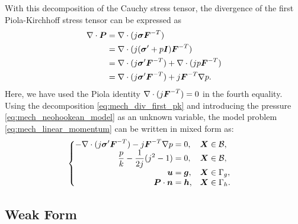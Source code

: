 With this decomposition of the Cauchy stress tensor, the divergence of the
first Piola-Kirchhoff stress tensor can be expressed as
%
\begin{gather}
\begin{aligned}
\nabla \cdot \boldsymbol{P} &= \nabla \cdot ( j \boldsymbol{\sigma} \boldsymbol{F}^{-T} ) \\
&= \nabla \cdot ( j (\boldsymbol{\sigma}' + p \boldsymbol{I}) \boldsymbol{F}^{-T} ) \\
&= \nabla \cdot ( j \boldsymbol{\sigma}' \boldsymbol{F}^{-T} ) +
\nabla \cdot ( j p \boldsymbol{F}^{-T} ) \\
&= \nabla \cdot ( j \boldsymbol{\sigma}' \boldsymbol{F}^{-T} ) + j \boldsymbol{F}^{-T} \nabla p.
\end{aligned}
\label{eq:mech_div_first_pk}
\end{gather}
%
Here, we have used the Piola identity $\nabla \cdot (j \boldsymbol{F}^{-T}) = 0$
in the fourth equality. Using the decomposition \eqref{eq:mech_div_first_pk}
and introducing the pressure \eqref{eq:mech_neohookean_model} as an unknown
variable, the model problem \eqref{eq:mech_linear_momentum} can be written
in mixed form as:
%
\begin{gather}
\begin{cases}
\begin{aligned}
- \nabla \cdot (j \boldsymbol{\sigma}' \boldsymbol{F}^{-T}) - j \boldsymbol{F}^{-T} \nabla p &= 0,
&& \boldsymbol{X} \in \mathcal{B}, \\
\frac{p}{k} - \frac{1}{2 j}(j^2 - 1) &= 0,
&& \boldsymbol{X} \in \mathcal{B}, \\
\boldsymbol{u} &= \boldsymbol{g}, && \boldsymbol{X} \in \Gamma_g, \\
\boldsymbol{P} \cdot \boldsymbol{n} &= \boldsymbol{h}, && \boldsymbol{X} \in \Gamma_h.
\end{aligned}
\end{cases}
\label{eq:mech_strong_form}
\end{gather}

\subsection{Weak Form}

